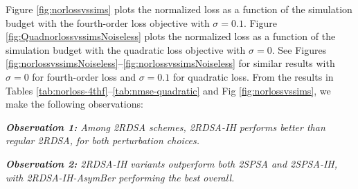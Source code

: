  Figure \ref{fig:norlossvssims} plots the normalized loss as a function of the simulation budget with the fourth-order loss objective with $\sigma=0.1$. Figure \ref{fig:QuadnorlossvssimsNoiseless} plots the normalized loss as a function of the simulation budget with the quadratic loss objective with $\sigma=0$. See Figures \ref{fig:norlossvssimsNoiseless}--\ref{fig:norlossvssimsNoiseless}  for similar results with $\sigma = 0$ for fourth-order loss and $\sigma=0.1$ for quadratic loss. 
 From the results in Tables \ref{tab:norloss-4thf}--\ref{tab:nmse-quadratic} and Fig \ref{fig:norlossvssims}, we make the following observations:
 
 \textit{\textbf{Observation 1:} Among 2RDSA schemes, 2RDSA-IH performs better than regular 2RDSA, for both perturbation choices.}
 
\textit{\textbf{Observation 2:} 2RDSA-IH variants outperform both 2SPSA and 2SPSA-IH, with 2RDSA-IH-AsymBer performing the best overall.}









